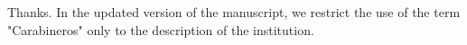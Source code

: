 
Thanks. In the updated version of the manuscript, we restrict the use of the term "Carabineros" only to the description of the institution.


